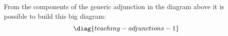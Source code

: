 \documentclass[oneside,12pt]{article}
\begin{document}
From the components of the generic adjunction in the diagram above it
is possible to build this big diagram:
%
$$\pu
  \diag{teaching-adjunctions-1}
$$
\end{document}
